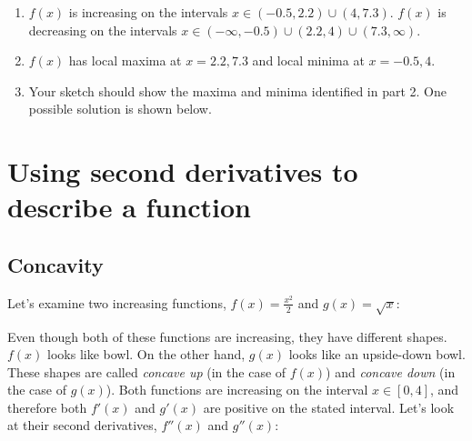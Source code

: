 \begin{Answer}
\begin{enumerate}
	\item $f(x)$ is increasing on the intervals $x\in (-0.5, 2.2)\cup(4, 7.3)$. 
	$f(x)$ is decreasing on the intervals $x\in (-\infty, -0.5)\cup(2.2, 4)\cup(
	7.3, \infty)$. 
	\item $f(x)$ has local maxima at $x = 2.2, 7.3$ and local minima at $x=-0.5, 
	4$. 
	\item Your sketch should show the maxima and minima identified in part 2. One 
	possible solution is shown below.
\end{enumerate}
\end{Answer}	

\section{Using second derivatives to describe a function}
\subsection{Concavity}
Let's examine two increasing functions, $f(x) = \frac{x^2}{2}$ and $g(x) = 
\sqrt{x}$:
\begin{figure}
\centering
{}
\end{figure}

Even though both of these functions are increasing, they have different shapes. 
$f(x)$ looks like bowl. On the other hand, $g(x)$ looks like an upside-down 
bowl. These shapes are called \textit{concave up} (in the case of $f(x)$) and 
\textit{concave down} (in the case of $g(x)$). Both functions are increasing on 
the interval $x \in [0, 4]$, and therefore both $f'(x)$ and $g'(x)$ are 
positive on the stated interval. Let's look at their second derivatives, $f''(x
)$ and $g''(x)$:

